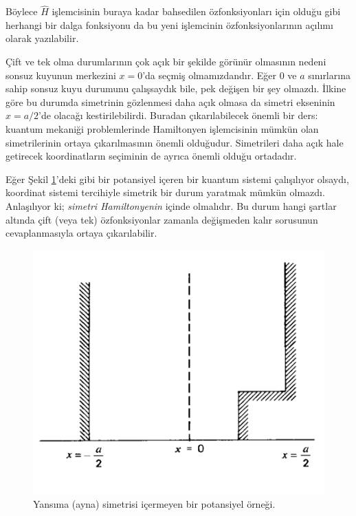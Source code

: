 \documentclass[a4paper,12pt, twoside]{article}
\begin{document}
Böylece $\hat H$ işlemcisinin buraya kadar bahsedilen özfonksiyonları için olduğu gibi herhangi bir dalga fonksiyonu da bu yeni işlemcinin özfonksiyonlarının açılımı olarak yazılabilir.

Çift ve tek olma durumlarının çok açık bir şekilde görünür olmasının nedeni sonsuz kuyunun merkezini $x=0$'da seçmiş olmamızdandır. Eğer $0$ ve $a$ sınırlarına sahip sonsuz kuyu durumunu çalışsaydık bile, pek değişen bir şey olmazdı. İlkine göre bu durumda simetrinin gözlenmesi daha açık olmasa da simetri ekseninin $x=a/2$'de olacağı kestirilebilirdi. Buradan çıkarılabilecek önemli bir ders: kuantum mekaniği problemlerinde Hamiltonyen işlemcisinin mümkün olan simetrilerinin ortaya çıkarılmasının önemli olduğudur. Simetrileri daha açık hale getirecek koordinatların seçiminin de ayrıca önemli olduğu ortadadır.

Eğer Şekil \ref{fig:nonSymmetricPot}'deki gibi bir potansiyel içeren bir kuantum sistemi çalışılıyor olsaydı, koordinat sistemi tercihiyle simetrik bir durum yaratmak mümkün olmazdı. Anlaşılıyor ki; \emph{simetri Hamiltonyenin} içinde olmalıdır. Bu durum hangi şartlar altında çift (veya tek) özfonksiyonlar zamanla değişmeden kalır sorusunun cevaplanmasıyla ortaya çıkarılabilir.
\begin{figure}[hbtp]
	\centering
	\includegraphics[width=0.5\linewidth]{figurler/non_symmetric_pot.png}
	\caption{Yansıma (ayna) simetrisi içermeyen bir potansiyel örneği.}
	\label{fig:nonSymmetricPot}
\end{figure}
\end{document}
